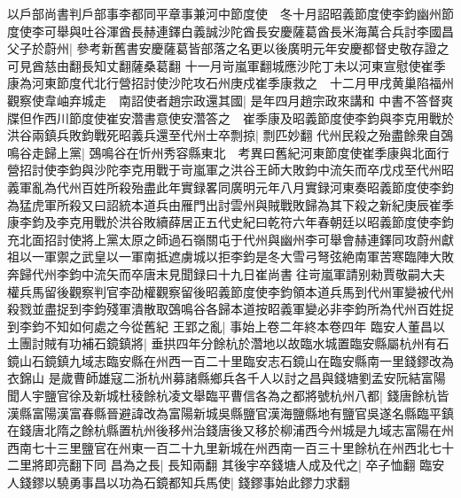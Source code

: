 以戶部尚書判戶部事李都同平章事兼河中節度使　冬十月詔昭義節度使李鈞幽州節度使李可舉與吐谷渾酋長赫連鐸白義誠沙陀酋長安慶薩葛酋長米海萬合兵討李國昌父子於蔚州|{
	參考新舊書安慶薩葛皆部落之名更以後廣明元年安慶都督史敬存證之可見酋慈由翻長知丈翻薩桑葛翻}
十一月岢嵐軍翻城應沙陀丁未以河東宣慰使崔季康為河東節度代北行營招討使沙陀攻石州庚戍崔季康救之　十二月甲戌黄巢陷福州觀察使韋岫弃城走　南詔使者趙宗政還其國|{
	是年四月趙宗政來講和}
中書不答督爽牒但作西川節度使崔安濳書意使安濳答之　崔季康及昭義節度使李鈞與李克用戰於洪谷兩鎮兵敗鈞戰死昭義兵還至代州士卒剽掠|{
	剽匹妙翻}
代州民殺之殆盡餘衆自鵶鳴谷走歸上黨|{
	鵶鳴谷在忻州秀容縣東北　考異曰舊紀河東節度使崔季康與北面行營招討使李鈞與沙陀李克用戰于岢嵐軍之洪谷王師大敗鈞中流矢而卒戊戍至代州昭義軍亂為代州百姓所殺殆盡此年實録畧同廣明元年八月實録河東奏昭義節度使李鈞為猛虎軍所殺又曰詔統本道兵由雁門出討雲州與賊戰敗歸為其下殺之新紀庚辰崔季康李鈞及李克用戰於洪谷敗續薛居正五代史紀曰乾符六年春朝廷以昭義節度使李鈞充北面招討使將上黨太原之師過石嶺關屯于代州與幽州李可舉會赫連鐸同攻蔚州獻祖以一軍禦之武皇以一軍南抵遮虜城以拒李鈞是冬大雪弓弩弦絶南軍苦寒臨陣大敗奔歸代州李鈞中流矢而卒唐末見聞録曰十九日崔尚書往岢嵐軍請别勑賈敬嗣大夫權兵馬留後觀察判官李劭權觀察留後昭義節度使李鈞領本道兵馬到代州軍變被代州殺戮並盡捉到李鈞殘軍潰散取鵶鳴谷各歸本道按眧義軍變必非李鈞所為代州百姓捉到李鈞不知如何處之今從舊紀}
王郢之亂|{
	事始上卷二年終本卷四年}
臨安人董昌以土團討賊有功補石鏡鎮將|{
	垂拱四年分餘杭於濳地以故臨水城置臨安縣屬杭州有石鏡山石鏡鎮九域志臨安縣在州西一百二十里臨安志石鏡山在臨安縣南一里錢鏐改為衣錦山}
是歲曹師雄寇二浙杭州募諸縣鄉兵各千人以討之昌與錢塘劉孟安阮結富陽聞人宇鹽官徐及新城杜稜餘杭凌文舉臨平曹信各為之都將號杭州八都|{
	錢唐餘杭皆漢縣富陽漢富春縣晉避諱改為富陽新城吳縣鹽官漢海鹽縣地有鹽官吳遂名縣臨平鎮在錢唐北隋之餘杭縣置杭州後移州治錢唐後又移於柳浦西今州城是九域志富陽在州西南七十三里鹽官在州東一百二十九里新城在州西南一百三十里餘杭在州西北七十二里將即亮翻下同}
昌為之長|{
	長知兩翻}
其後宇卒錢塘人成及代之|{
	卒子恤翻}
臨安人錢鏐以驍勇事昌以功為石鏡都知兵馬使|{
	錢鏐事始此鏐力求翻}


